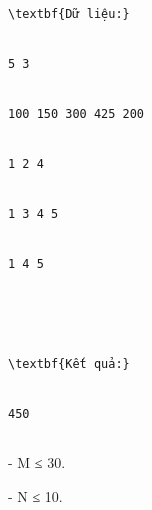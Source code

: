 \begin{verbatim}
\textbf{Dữ liệu:}


5 3


100 150 300 425 200


1 2 4


1 3 4 5


1 4 5





\textbf{Kết quả:}


450


\end{verbatim}
- M ≤ 30.   


   - N ≤ 10.